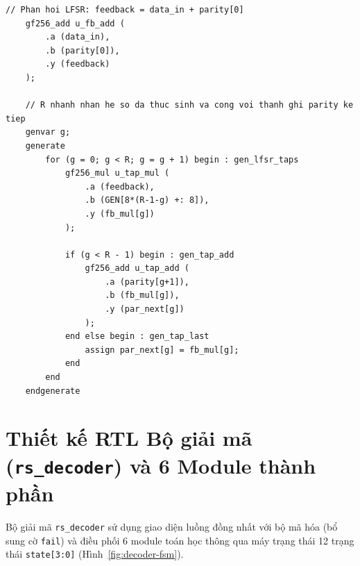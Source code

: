 \documentclass[11pt,a4paper]{report}
\begin{document}
\begin{lstlisting}[style=verilogstyle, caption={Trích đoạn RTL tạo nhánh phản hồi LFSR trong \texttt{rtl/rs\_encoder/rs\_encoder.v}}, label={lst:rs-encoder-lfsr}]
    // Phan hoi LFSR: feedback = data_in + parity[0]
    gf256_add u_fb_add (
        .a (data_in),
        .b (parity[0]),
        .y (feedback)
    );

    // R nhanh nhan he so da thuc sinh va cong voi thanh ghi parity ke tiep
    genvar g;
    generate
        for (g = 0; g < R; g = g + 1) begin : gen_lfsr_taps
            gf256_mul u_tap_mul (
                .a (feedback),
                .b (GEN[8*(R-1-g) +: 8]),
                .y (fb_mul[g])
            );

            if (g < R - 1) begin : gen_tap_add
                gf256_add u_tap_add (
                    .a (parity[g+1]),
                    .b (fb_mul[g]),
                    .y (par_next[g])
                );
            end else begin : gen_tap_last
                assign par_next[g] = fb_mul[g];
            end
        end
    endgenerate
\end{lstlisting}

\section{Thiết kế RTL Bộ giải mã (\texttt{rs\_decoder}) và 6 Module thành phần}
\label{sec:rs-decoder}

Bộ giải mã \texttt{rs\_decoder} sử dụng giao diện luồng đồng nhất với bộ mã hóa (bổ sung cờ \texttt{fail}) và điều phối 6 module toán học thông qua máy trạng thái 12 trạng thái \texttt{state[3:0]} (Hình~\ref{fig:decoder-fsm}).
\end{document}
